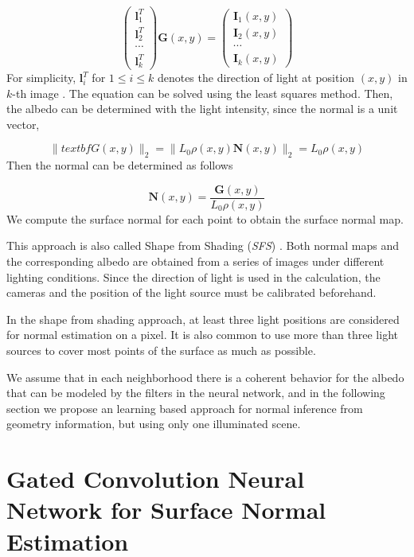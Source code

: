 \[ 
\begin{pmatrix}
	\textbf{l}_1^T \\
	\textbf{l}_2^T \\
	\cdots \\
	\textbf{l}_k^T
\end{pmatrix} \textbf{G}(x,y) = 
\begin{pmatrix}
	\textbf{I}_1(x,y) \\
	\textbf{I}_2(x,y) \\
	\cdots \\
	\textbf{I}_k(x,y)
\end{pmatrix}
\]
For simplicity, $ \textbf{l}_i^T $ for $ 1\le i \le k $ denotes the direction of light at position $ (x,y) $ in $ k $-th image . The equation can be solved using the least squares method. Then, the albedo can be determined with the light intensity, since the normal is a unit vector,

\[ \|textbf{G}(x,y)\|_2 = \|L_0\rho(x,y)\textbf{N}(x,y)\|_2 = L_0\rho(x,y) \]
Then the normal can be determined as follows

\[ \textbf{N}(x,y) = \frac{\textbf{G}(x,y)}{L_0\rho(x,y)}\]
We compute the surface normal for each point to obtain the surface normal map. 

This approach is also called Shape from Shading (\textit{SFS}) \cite{SFS}. Both normal maps and the corresponding albedo are obtained from a series of images under different lighting conditions. Since the direction of light is used in the calculation, the cameras and the position of the light source must be calibrated beforehand. 

In the shape from shading approach, at least three light positions are considered for normal estimation on a pixel. It is also common to use more than three light sources to cover most points of the surface as much as possible. 

We assume that in each neighborhood there is a coherent behavior for the albedo that can be modeled by the filters in the neural network, and in the following section we propose an learning based approach for normal inference from geometry information, but using only one illuminated scene.


\newpage 
\section{Gated Convolution Neural Network for Surface Normal Estimation}
\label{sec:gcnn}

